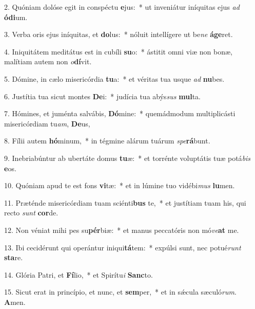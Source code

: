 2. Quóniam dolóse egit in conspéctu \textbf{e}jus:~*  ut inveniátur iníquitas ejus \textit{ad} \textbf{ó}\textbf{di}um.\

3. Verba oris ejus iníquitas, et \textbf{do}lus:~*  nóluit intellígere ut be\textit{ne} \textbf{á}\textbf{ge}ret.\

4. Iniquitátem meditátus est in cubíli \textbf{su}o:~*  ástitit omni viæ non bonæ, malítiam autem non \textit{o}\textbf{dí}vit.\

5. Dómine, in cælo misericórdia \textbf{tu}a:~*  et véritas tua usque \textit{ad} \textbf{nu}bes.\

6. Justítia tua sicut montes \textbf{De}i:~*  judícia tua abýs\textit{sus} \textbf{mul}ta.\

7. Hómines, et juménta salvábis, \textbf{Dó}mine:~*  quemádmodum multiplicásti misericórdiam tu\textit{am}, \textbf{De}us,\

8. Fílii autem \textbf{hó}minum,~*  in tégmine alárum tuárum \textit{spe}\textbf{rá}bunt.\

9. Inebriabúntur ab ubertáte domus \textbf{tu}æ:~*  et torrénte voluptátis tuæ potá\textit{bis} \textbf{e}os.\

10. Quóniam apud te est fons \textbf{vi}tæ:~*  et in lúmine tuo vidébi\textit{mus} \textbf{lu}men.\

11. Præténde misericórdiam tuam sciénti\textbf{bus} te,~*  et justítiam tuam his, qui recto \textit{sunt} \textbf{cor}de.\

12. Non véniat mihi pes su\textbf{pér}biæ:~*  et manus peccatóris non mó\textit{ve}\textbf{at} me.\

13. Ibi cecidérunt qui operántur iniqui\textbf{tá}tem:~*  expúlsi sunt, nec potué\textit{runt} \textbf{sta}re.\

14. Glória Patri, et \textbf{Fí}lio,~*  et Spirítu\textit{i} \textbf{Sanc}to.\

15. Sicut erat in princípio, et nunc, et \textbf{sem}per,~*  et in sǽcula sæculó\textit{rum}. \textbf{A}men.\

